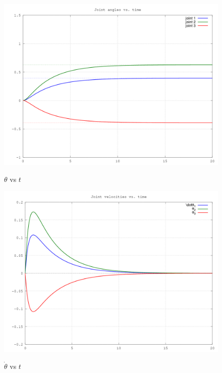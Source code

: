 \documentclass[10pt,a4paper]{article}
\begin{document}
\begin{figure}[H]
  \centering
  \includegraphics[angle = 0, scale = 0.3]{figures/Question1cJoints.png} 
  \label{fig:Q1cJoints}
  \caption{$\theta$ vs $t$}
\end{figure}

\begin{figure}[H]
  \centering
  \includegraphics[angle = 0, scale = 0.3]{figures/Question1cVels.png} 
  \label{fig:Q1cVels}
  \caption{$\dot{\theta}$ vs $t$}
\end{figure}
\end{document}
